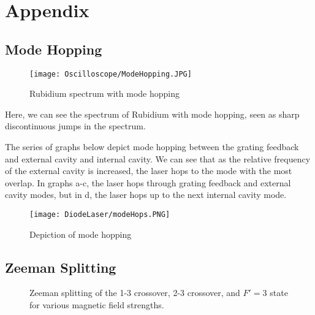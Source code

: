 	\section{Appendix}
	
	\subsection{Mode Hopping}
	\begin{multicols}{2}
		\begin{figure}[H]
			\centering
			\texttt{[image: Oscilloscope/ModeHopping.JPG]}
			\caption{Rubidium spectrum with mode hopping}
			\label{modeHopping}
		\end{figure}
	
		\columnbreak
		
		Here, we can see the spectrum of Rubidium with mode hopping, seen as sharp discontinuous jumps in the spectrum.
	\end{multicols}

	The series of graphs below depict mode hopping between the grating feedback and external cavity and internal cavity. We can see that as the relative frequency of the external cavity is increased, the laser hops to the mode with the most overlap. In graphs a-c, the laser hops through grating feedback and external cavity modes, but in d, the laser hops up to the next internal cavity mode. 
	\begin{figure}[H]
		\centering
		\texttt{[image: DiodeLaser/modeHops.PNG]}
		\caption{Depiction of mode hopping}
		\label{modeHops}
	\end{figure}
	
	\subsection{Zeeman Splitting}
	
	\begin{figure}[H]
		\centering
		\qquad
		
		\qquad
		
		\qquad
		
		
		\caption{\RbES Zeeman splitting of the 1-3 crossover, 2-3 crossover, and $F'=3$ state for various magnetic field strengths.}
		\label{HyperFineBField}
	\end{figure}

	
	